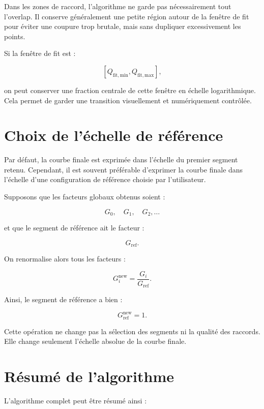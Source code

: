 \documentclass[11pt,a4paper]{article}
\begin{document}
Dans les zones de raccord, l'algorithme ne garde pas nécessairement tout
l'overlap. Il conserve généralement une petite région autour de la fenêtre de
fit pour éviter une coupure trop brutale, mais sans dupliquer excessivement les
points.

Si la fenêtre de fit est :

\[
    [Q_{\mathrm{fit,min}}, Q_{\mathrm{fit,max}}],
\]

on peut conserver une fraction centrale de cette fenêtre en échelle
logarithmique. Cela permet de garder une transition visuellement et
numériquement contrôlée.

\section{Choix de l'échelle de référence}

Par défaut, la courbe finale est exprimée dans l'échelle du premier segment
retenu. Cependant, il est souvent préférable d'exprimer la courbe finale dans
l'échelle d'une configuration de référence choisie par l'utilisateur.

Supposons que les facteurs globaux obtenus soient :

\[
    G_0,\quad G_1,\quad G_2,\ldots
\]

et que le segment de référence ait le facteur :

\[
    G_{\mathrm{ref}}.
\]

On renormalise alors tous les facteurs :

\[
    G_i^{\mathrm{new}}
    =
    \frac{G_i}{G_{\mathrm{ref}}}.
\]

Ainsi, le segment de référence a bien :

\[
    G_{\mathrm{ref}}^{\mathrm{new}} = 1.
\]

Cette opération ne change pas la sélection des segments ni la qualité des
raccords. Elle change seulement l'échelle absolue de la courbe finale.

\section{Résumé de l'algorithme}

L'algorithme complet peut être résumé ainsi :
\end{document}
